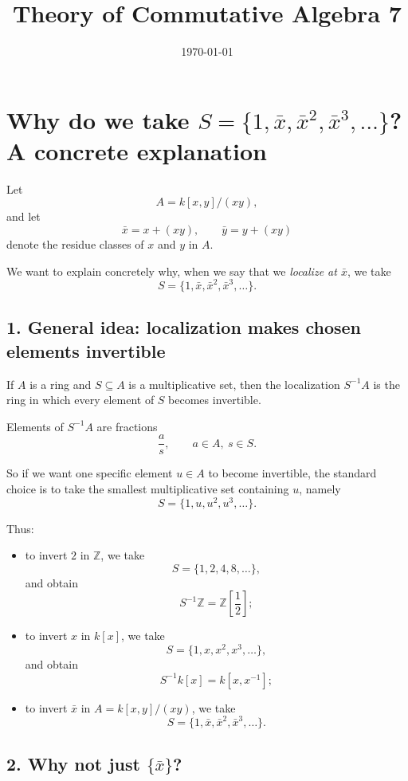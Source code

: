 \documentclass[12pt,a4paper]{article}
\title{\vspace{-1.5em}\bfseries Theory of Commutative Algebra 7}
\author{}
\date{\today}
\theoremstyle{notespace}
\begin{document}
	\maketitle
	\thispagestyle{fancy}
	
\section*{Why do we take \(S=\{1,\bar x,\bar x^{2},\bar x^{3},\dots\}\)? A concrete explanation}

Let
\[
A = k[x,y]/(xy),
\]
and let
\[
\bar x = x+(xy), \qquad \bar y = y+(xy)
\]
denote the residue classes of \(x\) and \(y\) in \(A\).

We want to explain concretely why, when we say that we \emph{localize at \(\bar x\)}, we take
\[
S=\{1,\bar x,\bar x^2,\bar x^3,\dots\}.
\]

\subsection*{1. General idea: localization makes chosen elements invertible}

If \(A\) is a ring and \(S\subseteq A\) is a multiplicative set, then the localization \(S^{-1}A\) is the ring in which every element of \(S\) becomes invertible.

Elements of \(S^{-1}A\) are fractions
\[
\frac{a}{s}, \qquad a\in A,\ s\in S.
\]

So if we want one specific element \(u\in A\) to become invertible, the standard choice is to take the smallest multiplicative set containing \(u\), namely
\[
S=\{1,u,u^2,u^3,\dots\}.
\]

Thus:

\begin{itemize}
	\item to invert \(2\) in \(\mathbb Z\), we take
	\[
	S=\{1,2,4,8,\dots\},
	\]
	and obtain
	\[
	S^{-1}\mathbb Z=\mathbb Z\!\left[\frac12\right];
	\]
	
	\item to invert \(x\) in \(k[x]\), we take
	\[
	S=\{1,x,x^2,x^3,\dots\},
	\]
	and obtain
	\[
	S^{-1}k[x]=k[x,x^{-1}];
	\]
	
	\item to invert \(\bar x\) in \(A=k[x,y]/(xy)\), we take
	\[
	S=\{1,\bar x,\bar x^2,\bar x^3,\dots\}.
	\]
\end{itemize}

\subsection*{2. Why not just \(\{\bar x\}\)?}
\end{document}
